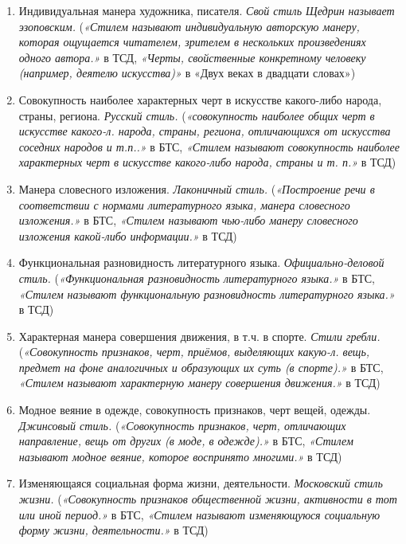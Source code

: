 \begin{enumerate}
    \item Индивидуальная манера художника, писателя. \textit{Свой стиль Щедрин называет эзоповским.}
(\textit{«Стилем называют индивидуальную авторскую манеру, которая ощущается читателем, зрителем в нескольких произведениях одного автора.»} в ТСД,
\textit{«Черты, свойственные конкретному человеку (например, деятелю искусства)»} в «Двух веках в двадцати словах»)

    \item Совокупность наиболее характерных черт в искусстве какого-либо народа, страны, региона. \textit{Русский стиль.}
(\textit{«совокупность наиболее общих черт в искусстве какого-л. народа, страны, региона, отличающихся от искусства соседних народов и т.п..»} в БТС,
\textit{«Стилем называют совокупность наиболее характерных черт в искусстве какого-либо народа, страны и т. п.»} в ТСД)

    \item Манера словесного изложения. \textit{Лаконичный стиль.}
(\textit{«Построение речи в соответствии с нормами литературного языка, манера словесного изложения.»} в БТС,
\textit{«Стилем называют чью-либо манеру словесного изложения какой-либо информации.»} в ТСД)

    \item Функциональная разновидность литературного языка. \textit{Официально-деловой стиль.}
(\textit{«Функциональная разновидность литературного языка.»} в БТС,
\textit{«Стилем называют функциональную разновидность литературного языка.»} в ТСД)

    \item Характерная манера совершения движения, в т.ч. в спорте. \textit{Стили гребли.}
(\textit{«Совокупность признаков, черт, приёмов, выделяющих какую-л. вещь, предмет на фоне аналогичных и образующих их суть (в спорте).»} в БТС,
\textit{«Стилем называют характерную манеру совершения движения.»} в ТСД)

    \item Модное веяние в одежде, совокупность признаков, черт вещей, одежды. \textit{Джинсовый стиль.}
(\textit{«Совокупность признаков, черт, отличающих направление, вещь от других (в моде, в одежде).»} в БТС,
\textit{«Стилем называют модное веяние, которое воспринято многими.»} в ТСД)

    \item Изменяющаяся социальная форма жизни, деятельности. \textit{Московский стиль жизни.}
(\textit{«Совокупность признаков общественной жизни, активности в тот или иной период.»} в БТС,
\textit{«Стилем называют изменяющуюся социальную форму жизни, деятельности.»} в ТСД)


\end{enumerate}
